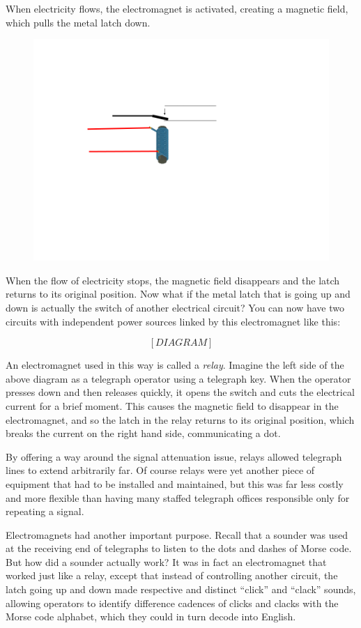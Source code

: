 \documentclass[UTF8]{book}
\begin{document}
\begin{CJK}{UTF8}{gbsn}
When electricity flows, the electromagnet is activated, creating a magnetic field, which pulls the metal latch down.

\begin{figure}[H]
\centering
\includegraphics[width=0.8\linewidth]{electromagnet_with_latch_2}
\end{figure}

When the flow of electricity stops, the magnetic field disappears and the latch returns to its original position. Now what if the metal latch that is going up and down is actually the switch of another electrical circuit? You can now have two circuits with independent power sources linked by this electromagnet like this:

\[ [DIAGRAM] \]

An electromagnet used in this way is called a \emph{relay}. Imagine the left side of the above diagram as a telegraph operator using a telegraph key. When the operator presses down and then releases quickly, it opens the switch and cuts the electrical current for a brief moment. This causes the magnetic field to disappear in the electromagnet, and so the latch in the relay returns to its original position, which breaks the current on the right hand side, communicating a dot.

By offering a way around the signal attenuation issue, relays allowed telegraph lines to extend arbitrarily far. Of course relays were yet another piece of equipment that had to be installed and maintained, but this was far less costly and more flexible than having many staffed telegraph offices responsible only for repeating a signal.

Electromagnets had another important purpose. Recall that a sounder was used at the receiving end of telegraphs to listen to the dots and dashes of Morse code. But how did a sounder actually work? It was in fact an electromagnet that worked just like a relay, except that instead of controlling another circuit, the latch going up and down made respective and distinct ``click'' and ``clack'' sounds, allowing operators to identify difference cadences of clicks and clacks with the Morse code alphabet, which they could in turn decode into English.


\end{CJK}
\end{document}
